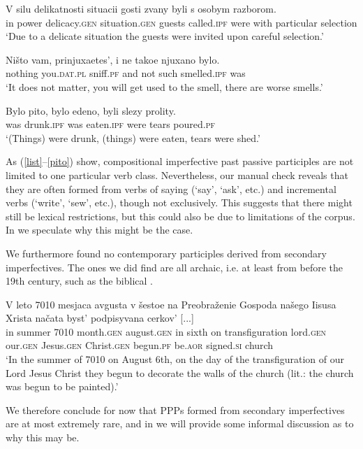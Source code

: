 \documentclass[output=paper,modfonts,newtxmath,hidelinks
]{langscibook}
\begin{document}
\ea\gll	V silu delikatnosti situacii gosti zvany byli s osobym razborom. \label{zvany}\\
	in power delicacy.\textsc{gen} situation.\textsc{gen} guests called.\textsc{ipf} were with particular selection\\
\glt	`Due to a delicate situation the guests were invited upon careful selection.'
\z

\ea\gll	Ništo vam, prinjuxaetes', i ne takoe njuxano bylo. \label{njuxano}\\ 
	nothing you.\textsc{dat}.\textsc{pl} sniff.\textsc{pf} and not such smelled.\textsc{ipf} was\\
\glt	`It does not matter, you will get used to the smell, there are worse smells.'
\z

\ea\gll	Bylo pito, bylo edeno, byli slezy prolity. \label{pito}\\
	was drunk.\textsc{ipf} was eaten.\textsc{ipf} were tears poured.\textsc{pf}\\
\glt	`(Things) were drunk, (things) were eaten, tears were shed.'
\z

\noindent As (\ref{list}--\ref{pito}) show, compositional imperfective past passive participles are not limited to one particular verb class. Nevertheless, our manual check reveals that they are often formed from verbs of saying (`say', `ask', etc.) and incremental verbs (`write', `sew', etc.), though not exclusively. This suggests that there might still be lexical restrictions, but this could also be due to limitations of the corpus. In  we speculate why this might be the case. 

We furthermore found no contemporary participles derived from secondary imperfectives. The ones we did find are all archaic, i.e. at least from before the 19th century, such as the biblical . 

\ea\gll	V leto 7010 mesjaca avgusta v šestoe na Preobraženie Gospoda našego Iisusa Xrista načata byst' podpisyvana cerkov' [...] \label{7010} \\
	in summer 7010 month.\textsc{gen} august.\textsc{gen} in sixth on transfiguration lord.\textsc{gen} our.\textsc{gen} Jesus.\textsc{gen} Christ.\textsc{gen} begun.\textsc{pf} be.\textsc{aor} signed.\textsc{si} church \\ 
\glt    `In the summer of 7010 on August 6th, on the day of the transfiguration of our Lord Jesus Christ they begun to decorate the walls of the church (lit.: the church was begun to be painted).'
\z

\noindent We therefore conclude for now that PPPs formed from secondary imperfectives are at most extremely rare, and in  we will provide some informal discussion as to why this may be. 
\end{document}
